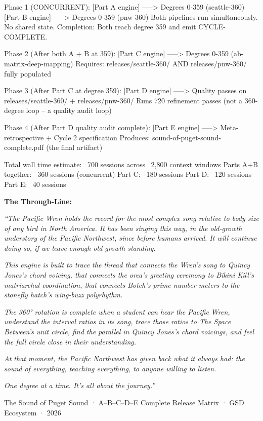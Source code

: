 \documentclass[11pt,letterpaper]{article}
\begin{document}
\begin{asciibox}
Phase 1 (CONCURRENT):
  [Part A engine] -----> Degrees 0-359 (seattle-360)
  [Part B engine] -----> Degrees 0-359 (pnw-360)
  Both pipelines run simultaneously. No shared state.
  Completion: Both reach degree 359 and emit CYCLE-COMPLETE.

Phase 2 (After both A + B at 359):
  [Part C engine] -----> Degrees 0-359 (ab-matrix-deep-mapping)
  Requires: releases/seattle-360/ AND releases/pnw-360/ fully populated

Phase 3 (After Part C at degree 359):
  [Part D engine] -----> Quality passes on releases/seattle-360/ + releases/pnw-360/
  Runs 720 refinement passes (not a 360-degree loop -- a quality audit loop)

Phase 4 (After Part D quality audit complete):
  [Part E engine] -----> Meta-retrospective + Cycle 2 specification
  Produces: sound-of-puget-sound-complete.pdf (the final artifact)

Total wall time estimate: ~700 sessions across ~2,800 context windows
Parts A+B together: ~360 sessions (concurrent)
Part C: ~180 sessions
Part D: ~120 sessions
Part E: ~40 sessions
\end{asciibox}

\vspace{1.5em}

\begin{quotebox}
\textbf{\sffamily\textcolor{primary}{The Through-Line:}}

\medskip
\textit{``The Pacific Wren holds the record for the most complex song relative to body size of
any bird in North America. It has been singing this way, in the old-growth understory of the
Pacific Northwest, since before humans arrived. It will continue doing so, if we leave enough
old-growth standing.}

\medskip
\textit{This engine is built to trace the thread that connects the Wren's song to Quincy Jones's
chord voicing, that connects the orca's greeting ceremony to Bikini Kill's matriarchal coordination,
that connects Botch's prime-number meters to the stonefly hatch's wing-buzz polyrhythm.}

\medskip
\textit{The 360° rotation is complete when a student can hear the Pacific Wren, understand the
interval ratios in its song, trace those ratios to \textit{The Space Between}'s unit circle, find the
parallel in Quincy Jones's chord voicings, and feel the full circle close in their understanding.}

\medskip
\textit{At that moment, the Pacific Northwest has given back what it always had: the sound
of everything, teaching everything, to anyone willing to listen.}

\medskip
\textit{One degree at a time. It's all about the journey.''}

\medskip
\textcolor{subtlegray}{\sffamily\small The Sound of Puget Sound · A–B–C–D–E Complete Release Matrix · GSD Ecosystem · 2026}
\end{quotebox}
\end{document}
